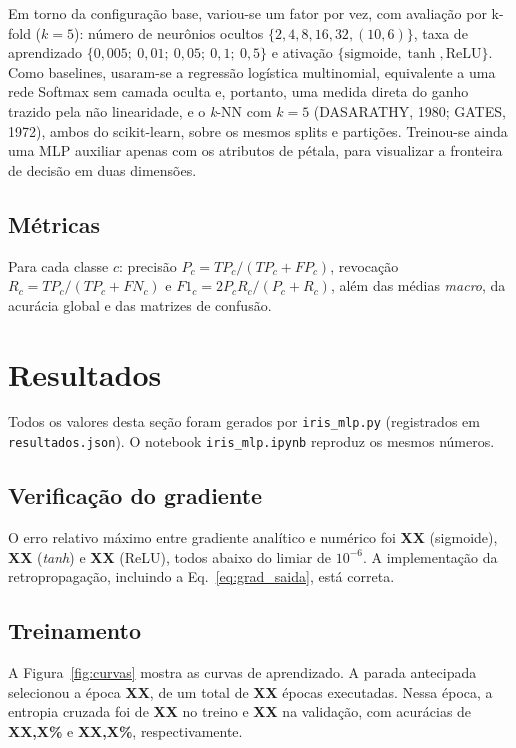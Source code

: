 \documentclass[12pt,a4paper]{article}
\newcommand{\XX}{\textbf{XX,X\%}}
\newcommand{\XN}{\textbf{XX}}
\newcommand{\AccVal}{\XX}        \newcommand{\AccTreino}{\XX}
\newcommand{\CETreino}{\XN}      \newcommand{\CEVal}{\XN}
\newcommand{\MelhorEpoca}{\XN}   \newcommand{\EpocasExec}{\XN}   \newcommand{\NParam}{\XN}
\newcommand{\GCSig}{\XN}         \newcommand{\GCTanh}{\XN}       \newcommand{\GCRelu}{\XN}
\begin{document}
Em torno da configuração base, variou-se um fator por vez, com avaliação por k-fold ($k=5$): número de
neurônios ocultos $\{2, 4, 8, 16, 32, (10,6)\}$, taxa de aprendizado
$\{0{,}005;\ 0{,}01;\ 0{,}05;\ 0{,}1;\ 0{,}5\}$ e ativação $\{\text{sigmoide}, \tanh, \text{ReLU}\}$.
Como baselines, usaram-se a regressão logística multinomial, equivalente a uma rede Softmax sem
camada oculta e, portanto, uma medida direta do ganho trazido pela não linearidade, e o
\textit{k}-NN com $k=5$ (DASARATHY, 1980; GATES, 1972), ambos do scikit-learn, sobre os mesmos splits e
partições. Treinou-se ainda uma MLP auxiliar apenas com os atributos de pétala, para visualizar a
fronteira de decisão em duas dimensões.

\subsection{Métricas}

Para cada classe $c$: precisão $P_c=TP_c/(TP_c+FP_c)$, revocação $R_c=TP_c/(TP_c+FN_c)$ e
$F1_c=2P_cR_c/(P_c+R_c)$, além das médias \textit{macro}, da acurácia global e das matrizes de
confusão.

\section{Resultados}
\label{sec:resultados}

Todos os valores desta seção foram gerados por \texttt{iris\_mlp.py} (registrados em
\texttt{resultados.json}). O notebook \texttt{iris\_mlp.ipynb} reproduz os mesmos números.

\subsection{Verificação do gradiente}

O erro relativo máximo entre gradiente analítico e numérico foi \GCSig{} (sigmoide), \GCTanh{}
(\textit{tanh}) e \GCRelu{} (ReLU), todos abaixo do limiar de $10^{-6}$. A implementação da
retropropagação, incluindo a Eq.~\eqref{eq:grad_saida}, está correta.

\subsection{Treinamento}

A Figura~\ref{fig:curvas} mostra as curvas de aprendizado. A parada antecipada selecionou a época
\MelhorEpoca{}, de um total de \EpocasExec{} épocas executadas. Nessa época, a entropia cruzada foi de
\CETreino{} no treino e \CEVal{} na validação, com acurácias de \AccTreino{} e \AccVal{},
respectivamente.
\end{document}
